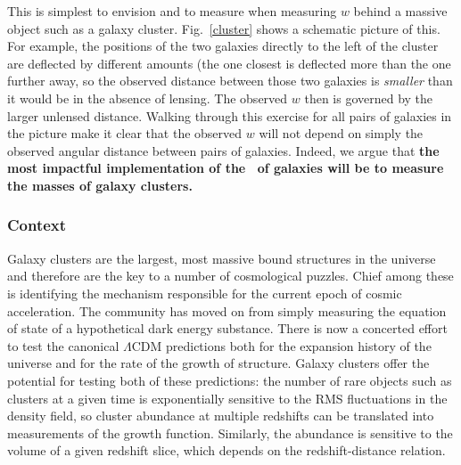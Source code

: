 This is simplest to envision and to measure when measuring $w$ behind a massive object such as a galaxy cluster. 
Fig.~\ref{cluster} shows a schematic picture of this. For example, the positions of the two galaxies directly to the left of the cluster are deflected by different amounts (the one closest is deflected more than the one further away, so the observed distance between those two galaxies is {\it smaller} than it would be in the absence of lensing. The observed $w$ then is governed by the larger unlensed distance. Walking through this exercise for all pairs of galaxies in the picture make it clear that the observed $w$ will not depend on simply the observed angular distance between pairs of galaxies. Indeed, we argue that {\bf the 
most impactful implementation of the \atf\ of galaxies will be to measure the masses of galaxy clusters.}


%
%

\subsubsection{Context}

Galaxy clusters are the largest, most massive bound structures in the
universe and therefore are the key to a number of cosmological
puzzles. Chief among these is identifying the mechanism responsible
for the current epoch of cosmic acceleration. The community has moved
on from simply measuring the equation of state of a hypothetical dark
energy substance. There is now a concerted effort to test the
canonical $ \Lambda$CDM predictions both for the expansion history of
the universe and for the rate of the growth of structure. Galaxy
clusters offer the potential for testing both of these predictions:
the number of rare objects such as clusters at a given time is
exponentially sensitive to the RMS fluctuations in the density field,
so cluster abundance at multiple redshifts can be translated into measurements of the growth function. Similarly, the abundance is
sensitive to the volume of a given redshift slice, which depends on
the redshift-distance relation.

